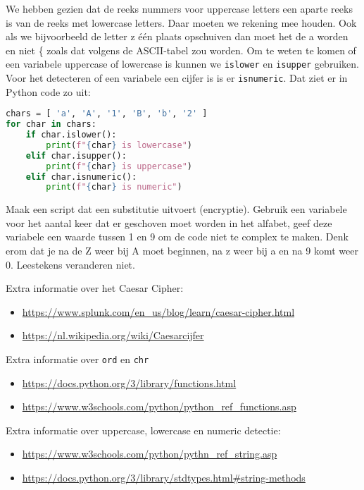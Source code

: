 We hebben gezien dat de reeks nummers voor uppercase letters een aparte reeks is van de reeks met lowercase letters. Daar moeten we rekening mee houden. Ook als we bijvoorbeeld de letter z \'e\'en plaats opschuiven dan moet het de a worden en niet \{ zoals dat volgens de ASCII-tabel zou worden. Om te weten te komen of een variabele uppercase of lowercase is kunnen we \texttt{islower} en \texttt{isupper} gebruiken. Voor het detecteren of een variabele een cijfer is is er \texttt{isnumeric}. Dat ziet er in Python code zo uit:
\begin{lstlisting}[language=python]
chars = [ 'a', 'A', '1', 'B', 'b', '2' ]
for char in chars:
    if char.islower():
        print(f"{char} is lowercase")
    elif char.isupper():
        print(f"{char} is uppercase")
    elif char.isnumeric():
        print(f"{char} is numeric")
\end{lstlisting}

Maak een script dat een substitutie uitvoert (encryptie). Gebruik een variabele voor het aantal keer dat er geschoven moet worden in het alfabet, geef deze variabele een waarde tussen 1 en 9 om de code niet te complex te maken. Denk erom dat je na de Z weer bij A moet beginnen, na z weer bij a en na 9 komt weer 0. Leestekens veranderen niet.

Extra informatie over het Caesar Cipher:
\begin{itemize}
	\item \url{https://www.splunk.com/en\_us/blog/learn/caesar-cipher.html}
	\item \url{https://nl.wikipedia.org/wiki/Caesarcijfer}
\end{itemize}

Extra informatie over \texttt{ord} en \texttt{chr}
\begin{itemize}
	\item \url{https://docs.python.org/3/library/functions.html}
	\item \url{https://www.w3schools.com/python/python\_ref\_functions.asp}
\end{itemize}

Extra informatie over uppercase, lowercase en numeric detectie:
\begin{itemize}
	\item \url{https://www.w3schools.com/python/pythn\_ref\_string.asp}
	\item \url{https://docs.python.org/3/library/stdtypes.html#string-methods}
\end{itemize}

